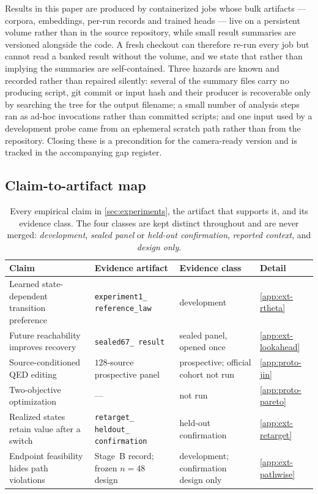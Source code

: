 Results in this paper are produced by containerized jobs whose bulk artifacts --- corpora, embeddings, per-run records and trained heads --- live on a persistent volume rather than in the source repository, while small result summaries are versioned alongside the code.
A fresh checkout can therefore re-run every job but cannot read a banked result without the volume, and we state that rather than implying the summaries are self-contained.
Three hazards are known and recorded rather than repaired silently: several of the summary files carry no producing script, git commit or input hash and their producer is recoverable only by searching the tree for the output filename; a small number of analysis steps ran as ad-hoc invocations rather than committed scripts; and one input used by a development probe came from an ephemeral scratch path rather than from the repository.
Closing these is a precondition for the camera-ready version and is tracked in the accompanying gap register.

\subsection{Claim-to-artifact map}

\begin{table}[h]
\centering
{\footnotesize\setlength{\tabcolsep}{4pt}
\begin{tabularx}{\textwidth}{@{}XXXl@{}}
\toprule
Claim & Evidence artifact & Evidence class & Detail \\
\midrule
Learned state-dependent transition preference & \texttt{experiment1\_ reference\_law} & development & \cref{app:ext-rtheta} \\
Future reachability improves recovery & \texttt{sealed67\_ result} & sealed panel, opened once & \cref{app:ext-lookahead} \\
Source-conditioned {QED} editing & $128$-source prospective panel & prospective; official cohort not run & \cref{app:proto-jin} \\
Two-objective optimization & --- & not run & \cref{app:proto-pareto} \\
Realized states retain value after a switch & \texttt{retarget\_ heldout\_ confirmation} & held-out confirmation & \cref{app:ext-retarget} \\
Endpoint feasibility hides path violations & Stage~B record; frozen $n{=}48$ design & development; confirmation design only & \cref{app:ext-pathwise} \\
\bottomrule
\end{tabularx}}
\caption{\small Every empirical claim in \cref{sec:experiments}, the artifact that supports it, and its evidence class. The four classes are kept distinct throughout and are never merged: \emph{development}, \emph{sealed panel} or \emph{held-out confirmation}, \emph{reported context}, and \emph{design only}.}
\label{tab:claimmap}
\end{table}

